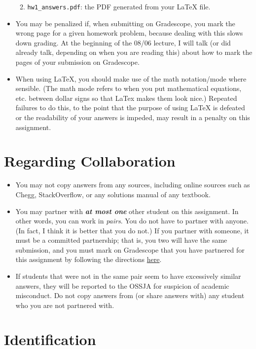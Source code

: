 \documentclass{article}
\begin{document}
\begin{itemize}[itemsep=0mm, parsep=0pt]
\begin{enumerate}[itemsep=0mm, parsep=0pt]
\begin{itemize}[itemsep=0mm, parsep=0pt]
        \end{itemize}
    \item \lstinline{hw1_answers.pdf}: the PDF generated from your LaTeX file.
    \end{enumerate}
\item You may be penalized if, when submitting on Gradescope, you mark the wrong page for a given homework problem, because dealing with this slows down grading. At the beginning of the 08/06 lecture, I will talk (or did already talk, depending on when you are reading this) about how to mark the pages of your submission on Gradescope.
\item When using LaTeX, you should make use of the math notation/mode where sensible. (The math mode refers to when you put mathematical equations, etc. between dollar signs so that LaTex makes them look nice.) Repeated failures to do this, to the point that the purpose of using LaTeX is defeated or the readability of your answers is impeded, may result in a penalty on this assignment.
\end{itemize}

\section{Regarding Collaboration}

\begin{itemize}[itemsep=0mm, parsep=0pt]
\item You may not copy answers from any sources, including online sources such as Chegg, StackOverflow, or any solutions manual of any textbook.
\item You may partner with \textbf{\textit{at most one}} other student on this assignment. In other words, you can work in \textit{pairs}. You do not have to partner with anyone. (In fact, I think it is better that you do not.) If you partner with someone, it must be a committed partnership; that is, you two will have the same submission, and you must mark on Gradescope that you have partnered for this assignment by following the directions \href{https://www.youtube.com/watch?v=rue7p_kATLA}{here}.
\item If students that were not in the same pair seem to have excessively similar answers, they will be reported to the OSSJA for suspicion of academic misconduct. Do not copy answers from (or share answers with) any student who you are not partnered with.
\end{itemize}

\section{Identification}
\end{document}
